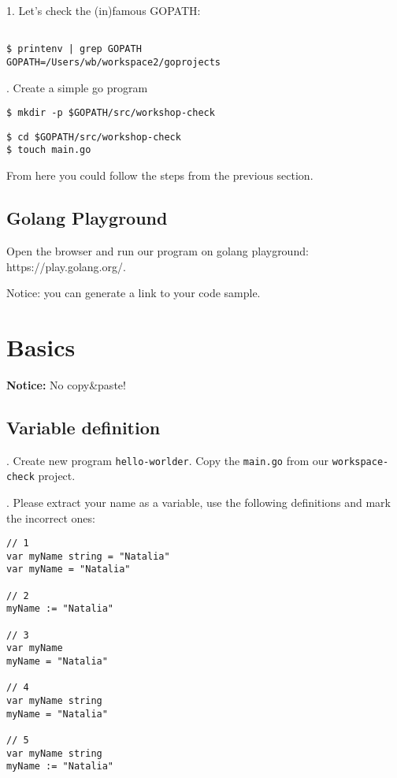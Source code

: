 \documentclass[11pt, letterpaper]{article}
\begin{document}
1. Let's check the (in)famous {\small GOPATH}:

\begin{verbatim}

$ printenv | grep GOPATH
GOPATH=/Users/wb/workspace2/goprojects
\end{verbatim}

. Create a simple go program

\begin{verbatim}
$ mkdir -p $GOPATH/src/workshop-check
\end{verbatim}

\begin{verbatim}
$ cd $GOPATH/src/workshop-check
$ touch main.go
\end{verbatim}

From here you could follow the steps from the previous section.

\subsection{Golang Playground}

Open the browser and run our program on golang playground: https://play.golang.org/.

Notice: you can generate a link to your code sample.

%
\section{Basics}

\bigskip
\textbf{Notice:} No copy\&paste!
\bigskip

\subsection{Variable definition}
. Create new program \verb|hello-worlder|. Copy the \verb|main.go| from our \verb|workspace-check| project.

. Please extract your name as a variable, use the following definitions and mark the incorrect ones:

\begin{verbatim}
// 1
var myName string = "Natalia"
var myName = "Natalia"

// 2
myName := "Natalia"

// 3
var myName
myName = "Natalia"

// 4
var myName string
myName = "Natalia"

// 5
var myName string
myName := "Natalia"
\end{verbatim}
\end{document}
